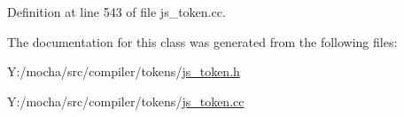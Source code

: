 Definition at line 543 of file js\_\-token.cc.



The documentation for this class was generated from the following files:\begin{DoxyCompactItemize}
\item 
Y:/mocha/src/compiler/tokens/\hyperlink{js__token_8h}{js\_\-token.h}\item 
Y:/mocha/src/compiler/tokens/\hyperlink{js__token_8cc}{js\_\-token.cc}\end{DoxyCompactItemize}
